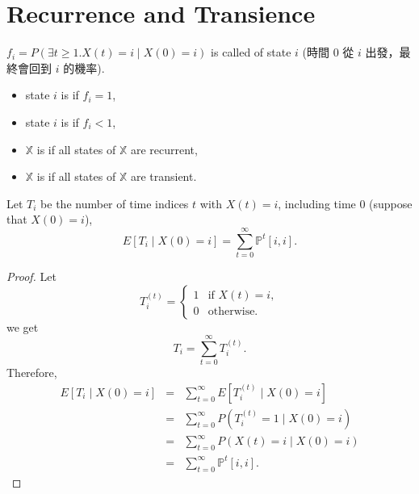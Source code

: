 \section{Recurrence and Transience}

\begin{definition}
$ f_{i} = P(\exists t \ge 1. X(t) = i \mid X(0) = i) $ is called  of state $ i $ {\small \color{gray} (時間 $ 0 $ 從 $ i $ 出發，最終會回到 $ i $ 的機率)}.
\begin{itemize}
  \item state $ i $ is  if $ f_{i} = 1 $,
  \item state $ i $ is  if $ f_{i} < 1 $,
  \item $ \mathbb{X} $ is  if all states of $ \mathbb{X} $ are recurrent,
  \item $ \mathbb{X} $ is  if all states of $ \mathbb{X} $ are transient.
\end{itemize}
\end{definition}

\begin{observation}
Let $ T_{i} $ be the number of time indices $ t $ with $ X(t) = i $, including time $ 0 $ (suppose that $ X(0) = i $),
\[ E[T_{i} \mid X(0) = i] = \sum_{t = 0}^{\infty} \mathbb{P}^{t}[i, i]. \]

\begin{proof}
Let
\[
T^{(t)}_{i} =
  \begin{cases}
    1 & \text{if } X(t) = i, \\
    0 & \text{otherwise.}
  \end{cases}
\]
we get
\[ T_{i} = \sum_{t = 0}^{\infty} T^{(t)}_{i}. \]
Therefore,
\begin{eqnarray*}
E[T_{i} \mid X(0) = i]
  & = & \sum_{t = 0}^{\infty} E[T^{(t)}_{i} \mid X(0) = i] \\
  & = & \sum_{t = 0}^{\infty} P(T^{(t)}_{i} = 1 \mid X(0) = i) \\
  & = & \sum_{t = 0}^{\infty} P(X(t) = i \mid X(0) = i) \\
  & = & \sum_{t = 0}^{\infty} \mathbb{P}^{t}[i, i].
\end{eqnarray*}
\end{proof}
\end{observation}

